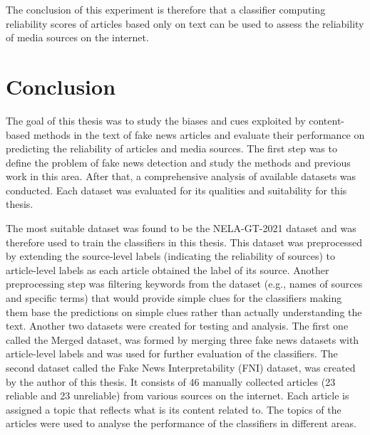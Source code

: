 The conclusion of this experiment is therefore that a classifier computing reliability scores of articles based only on text can be used to assess the reliability of media sources on the internet.



\chapter{Conclusion}
\label{conclusion}
The goal of this thesis was to study the biases and cues exploited by content-based methods in the text of fake news articles and evaluate their performance on predicting the reliability of articles and media sources. The first step was to define the problem of fake news detection and study the methods and previous work in this area. After that, a comprehensive analysis of available datasets was conducted. Each dataset was evaluated for its qualities and suitability for this thesis.

The most suitable dataset was found to be the NELA-GT-2021 dataset and was therefore used to train the classifiers in this thesis. This dataset was preprocessed by extending the source-level labels (indicating the reliability of sources) to article-level labels as each article obtained the label of its source. Another preprocessing step was filtering keywords from the dataset (e.g., names of sources and specific terms) that would provide simple clues for the classifiers making them base the predictions on simple clues rather than actually understanding the text.
Another two datasets were created for testing and analysis. The first one called the Merged dataset, was formed by merging three fake news datasets with article-level labels and was used for further evaluation of the classifiers. The second dataset called the Fake News Interpretability (FNI) dataset, was created by the author of this thesis. It consists of 46 manually collected articles (23 reliable and 23 unreliable) from various sources on the internet. Each article is assigned a topic that reflects what is its content related to. The topics of the articles were used to analyse the performance of the classifiers in different areas.

